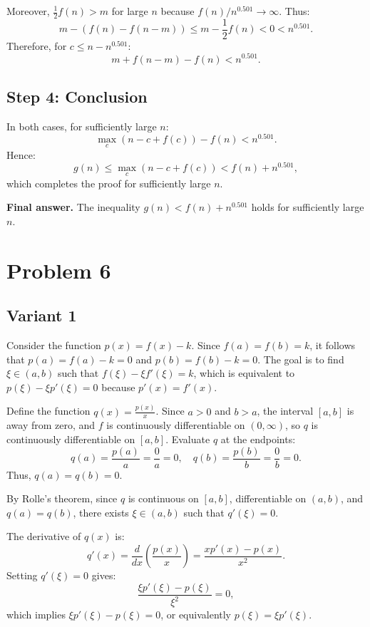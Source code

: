 \documentclass[12pt,a4paper]{article}
\theoremstyle{definition}
\begin{document}
    Moreover, $\frac{1}{2} f(n) > m$ for large $n$ because $f(n) / n^{0.501} \to \infty$. Thus:
    \[
        m - \left( f(n) - f(n - m) \right) \leq m - \frac{1}{2} f(n) < 0 < n^{0.501}.
    \]
    Therefore, for $c \leq n - n^{0.501}$:
    \[
        m + f(n - m) - f(n) < n^{0.501}.
    \]

    \subsection*{Step 4: Conclusion}
    In both cases, for sufficiently large $n$:
    \[
        \max_c \left( n - c + f(c) \right) - f(n) < n^{0.501}.
    \]
    Hence:
    \[
        g(n) \leq \max_c \left( n - c + f(c) \right) < f(n) + n^{0.501},
    \]
    which completes the proof for sufficiently large $n$.

    \textbf{Final answer.}
    The inequality $g(n) < f(n) + n^{0.501}$ holds for sufficiently large $n$.

\section{Problem 6}
\subsection{Variant 1}
    Consider the function $p(x) = f(x) - k$. Since $f(a) = f(b) = k$, it follows that $p(a) = f(a) - k = 0$ and $p(b) = f(b) - k = 0$. The goal is to find $\xi \in (a, b)$ such that $f(\xi) - \xi f'(\xi) = k$, which is equivalent to $p(\xi) - \xi p'(\xi) = 0$ because $p'(x) = f'(x)$.

    Define the function $q(x) = \frac{p(x)}{x}$. Since $a > 0$ and $b > a$, the interval $[a, b]$ is away from zero, and $f$ is continuously differentiable on $(0, \infty)$, so $q$ is continuously differentiable on $[a, b]$. Evaluate $q$ at the endpoints:
    \[
        q(a) = \frac{p(a)}{a} = \frac{0}{a} = 0, \quad q(b) = \frac{p(b)}{b} = \frac{0}{b} = 0.
    \]
    Thus, $q(a) = q(b) = 0$.

    By Rolle's theorem, since $q$ is continuous on $[a, b]$, differentiable on $(a, b)$, and $q(a) = q(b)$, there exists $\xi \in (a, b)$ such that $q'(\xi) = 0$.

    The derivative of $q(x)$ is:
    \[
        q'(x) = \frac{d}{dx} \left( \frac{p(x)}{x} \right) = \frac{x p'(x) - p(x)}{x^2}.
    \]
    Setting $q'(\xi) = 0$ gives:
    \[
        \frac{\xi p'(\xi) - p(\xi)}{\xi^2} = 0,
    \]
    which implies $\xi p'(\xi) - p(\xi) = 0$, or equivalently $p(\xi) = \xi p'(\xi)$.
\end{document}
